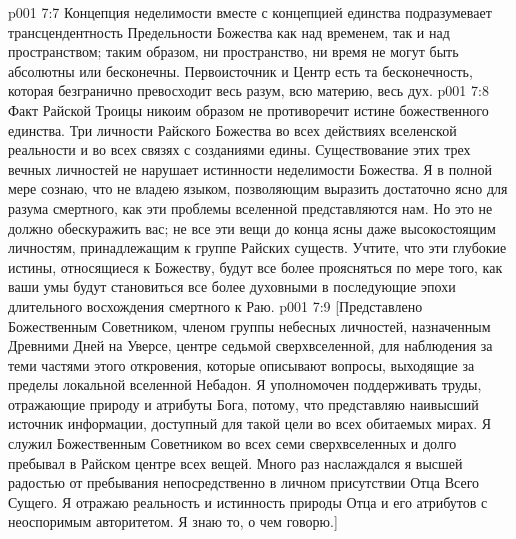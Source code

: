 \vs p001 7:7 Концепция неделимости вместе с концепцией единства подразумевает трансцендентность Предельности Божества как над временем, так и над пространством; таким образом, ни пространство, ни время не могут быть абсолютны или бесконечны. Первоисточник и Центр есть та бесконечность, которая безгранично превосходит весь разум, всю материю, весь дух.
\vs p001 7:8 Факт Райской Троицы никоим образом не противоречит истине божественного единства. Три личности Райского Божества во всех действиях вселенской реальности и во всех связях с созданиями едины. Существование этих трех вечных личностей не нарушает истинности неделимости Божества. Я в полной мере сознаю, что не владею языком, позволяющим выразить достаточно ясно для разума смертного, как эти проблемы вселенной представляются нам. Но это не должно обескуражить вас; не все эти вещи до конца ясны даже высокостоящим личностям, принадлежащим к группе Райских существ. Учтите, что эти глубокие истины, относящиеся к Божеству, будут все более проясняться по мере того, как ваши умы будут становиться все более духовными в последующие эпохи длительного восхождения смертного к Раю.
\vsetoff
\vs p001 7:9 [Представлено Божественным Советником, членом группы небесных личностей, назначенным Древними Дней на Уверсе, центре седьмой сверхвселенной, для наблюдения за теми частями этого откровения, которые описывают вопросы, выходящие за пределы локальной вселенной Небадон. Я уполномочен поддерживать труды, отражающие природу и атрибуты Бога, потому, что представляю наивысший источник информации, доступный для такой цели во всех обитаемых мирах. Я служил Божественным Советником во всех семи сверхвселенных и долго пребывал в Райском центре всех вещей. Много раз наслаждался я высшей радостью от пребывания непосредственно в личном присутствии Отца Всего Сущего. Я отражаю реальность и истинность природы Отца и его атрибутов с неоспоримым авторитетом. Я знаю то, о чем говорю.]
